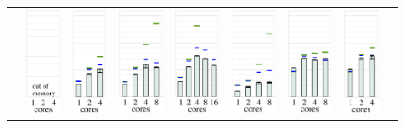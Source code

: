 \begin{tabular}{lcccccccc}
  & 
  \includegraphics[height=3.0cm,clip=true]{images/perf/p-80/p-woody-hsw-mat_Kii_sd22_size750141_load2_newton1}%
  & 
  \includegraphics[height=3.0cm,clip=true]{images/perf/p-80/p-hasep1-mat_Kii_sd22_size750141_load2_newton1}%
  & 
  \includegraphics[height=3.0cm,clip=true]{images/perf/p-80/p-meggie-mat_Kii_sd22_size750141_load2_newton1}%
  & 
  \includegraphics[height=3.0cm,clip=true]{images/perf/p-80/p-skylakesp2-mat_Kii_sd22_size750141_load2_newton1}%
  & 
  \includegraphics[height=3.0cm,clip=true]{images/perf/p-80/p-knightmare1-mat_Kii_sd22_size750141_load2_newton1}%
  & 
  \includegraphics[height=3.0cm,clip=true]{images/perf/p-80/p-summitridge1-mat_Kii_sd22_size750141_load2_newton1}%
  & 
  \includegraphics[height=3.0cm,clip=true]{images/perf/p-80/p-naples1-mat_Kii_sd22_size750141_load2_newton1}%
\\




\end{tabular}
